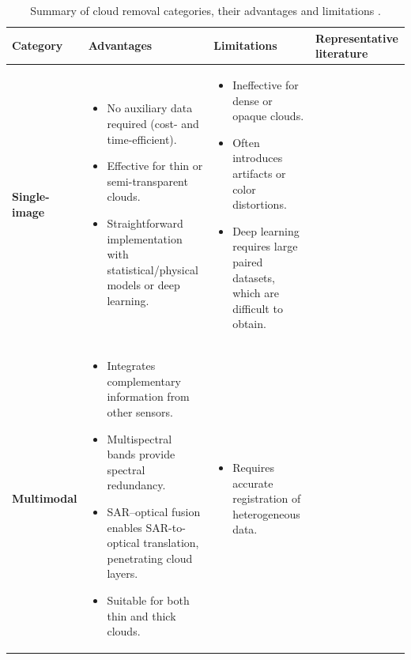 \begin{table}[ht]
\centering
\caption{Summary of cloud removal categories, their advantages and limitations \cite{CR_Advances_Review_ORS, sar_2_opt_CGAN_survey_taxonomy}.}
\label{tab:cloud_removal_categories}
\begin{adjustbox}{max width=\textwidth, keepaspectratio=false}
\begin{tabular}{p{2.5cm} p{6cm} p{6cm} p{3cm}}
\toprule
\textbf{Category} & \textbf{Advantages} & \textbf{Limitations} & \textbf{Representative literature} \\
\midrule
\textbf{Single-image} & 
\begin{itemize}[nosep,leftmargin=*]
  \item No auxiliary data required (cost- and time-efficient).
  \item Effective for thin or semi-transparent clouds.
  \item Straightforward implementation with statistical/physical models or deep learning.
\end{itemize} &
\begin{itemize}[nosep,leftmargin=*]
  \item Ineffective for dense or opaque clouds.
  \item Often introduces artifacts or color distortions.
  \item Deep learning requires large paired datasets, which are difficult to obtain.
\end{itemize} &
\cite{single_variation} \cite{single_haze_removal_dark_prior} \cite{single_artifact_free_CR_GAN} \cite{single_thin_CR_ORS_GAN_phys} \cite{single_multi_DR_CR} \cite{single_CR_DLM_matting} \cite{single_AGLC_GAN} \cite{single_PNBT_CR} \cite{single_CGAN_scattering_martian} \\
\midrule
\textbf{Multimodal} &
\begin{itemize}[nosep,leftmargin=*]
  \item Integrates complementary information from other sensors.
  \item Multispectral bands provide spectral redundancy.
  \item SAR–optical fusion enables SAR-to-optical translation, penetrating cloud layers.
  \item Suitable for both thin and thick clouds.
\end{itemize} &
\begin{itemize}[nosep,leftmargin=*]
  \item Requires accurate registration of heterogeneous data.

\end{itemize}
\end{tabular}
\end{adjustbox}
\end{table}
